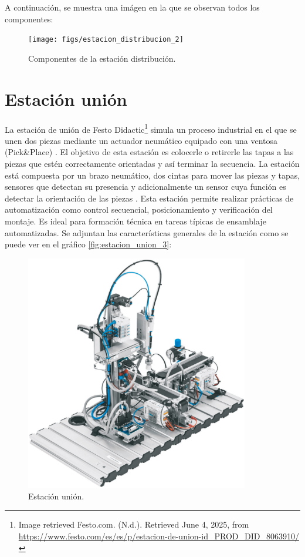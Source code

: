 A continuación, se muestra una imágen en la que se observan todos los componentes:

\begin{figure} [h!]
  \begin{center}
    \texttt{[image: figs/estacion\_distribucion\_2]}
  \end{center}
  \caption{\centering Componentes de la estación distribución.}
  \label{fig:estacion_distribucion_2}
\end{figure} 

\section{Estación unión}

La estación de unión de Festo Didactic\footnote{Image retrieved Festo.com.  (N.d.). Retrieved June 4, 2025, from  \url{https://www.festo.com/es/es/p/estacion-de-union-id_PROD_DID_8063910/}} simula un proceso industrial en el que se unen dos piezas mediante un actuador neumático equipado con una ventosa (Pick\&Place) \cite{estacion_union}. El objetivo de esta estación es colocerle o retirerle las tapas a las piezas que estén correctamente orientadas y así terminar la secuencia. La estación está compuesta por un brazo neumático, dos cintas para mover las piezas y tapas, sensores que detectan su presencia y adicionalmente un sensor cuya función es detectar la orientación de las piezas \cite{estacion_union}. Esta estación permite realizar prácticas de automatización como control secuencial, posicionamiento y verificación del montaje. Es ideal para formación técnica en tareas típicas de ensamblaje automatizadas. Se adjuntan las características generales de la estación como se puede ver en el gráfico \ref{fig:estacion_union_3}:


\begin{figure} [h!]
  \begin{center}
    \includegraphics[width=9.75cm]{figs/estacion_union_1}
  \end{center}
  \caption{\centering Estación unión. \cite{estacion_union}}
  \label{fig:estacion_union_1}
\end{figure} 

